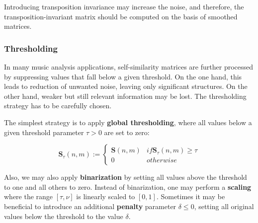 \documentclass[a4paper, 9pt, twocolumn]{extarticle}
\begin{document}
Introducing transposition invariance may increase the noise, and therefore, the transposition-invariant matrix should be computed on the basis of smoothed matrices. 


\subsubsection{Thresholding}
\label{subsubsection:ssmEnhancementThresholding}

In many music analysis applications, self-similarity matrices are further processed by suppressing values that fall below a given threshold. On the one hand, this leads to reduction of unwanted noise, leaving only significant structures. On the other hand, weaker but still relevant information may be lost. The thresholding strategy has to be carefully chosen. 

The simplest strategy is to apply \textbf{global thresholding}, where all values below a given threshold parameter $\tau>0$ are set to zero:

\[\textbf{S}_{\tau}(n,m):= 
 \begin{cases} 
      \textbf{S}(n,m) & if  \textbf{S}_{\tau}(n,m)\geq\tau \\
      0 & otherwise 
   \end{cases}
\]  

Also, we may also apply \textbf{binarization} by setting all values above the threshold to one and all others to zero. Instead of binarization, one may perform a \textbf{scaling} where the range $[\tau, \nu]$ is linearly scaled to $[0, 1]$.  Sometimes it may be beneficial to introduce an additional \textbf{penalty} parameter $\delta\leq0$, setting all original values below the threshold to the value $\delta$.
\end{document}
